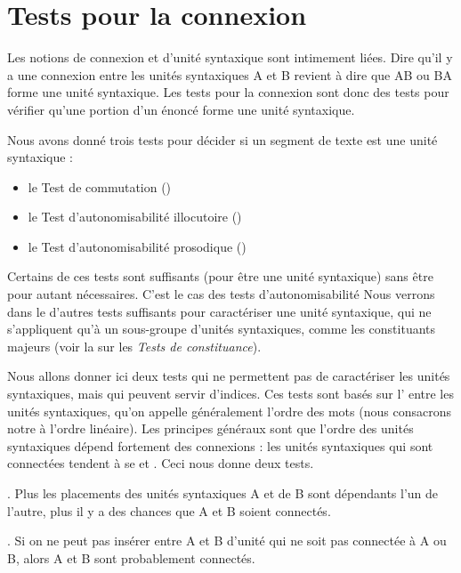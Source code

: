\section{Tests pour la connexion}\label{sec:3.2.16}%

Les notions de connexion et d’unité syntaxique sont intimement liées. Dire qu’il y a une connexion entre les unités syntaxiques A et B revient à dire que AB ou BA forme une unité syntaxique. Les tests pour la connexion sont donc des tests pour vérifier qu’une portion d’un énoncé forme une unité syntaxique.

Nous avons donné trois tests pour décider si un segment de texte est une unité syntaxique :

\begin{itemize}
\item le Test de commutation ()
\item le Test d’autonomisabilité illocutoire ()
\item le Test d’autonomisabilité prosodique ()
\end{itemize}

Certains de ces tests sont suffisants (pour être une unité syntaxique) sans être pour autant nécessaires. C'est le cas des tests d'autonomisabilité
Nous verrons dans le  d'autres tests suffisants pour caractériser une unité syntaxique, qui ne s’appliquent qu’à un sous-groupe d’unités syntaxiques, comme les constituants majeurs (voir la  sur les \textit{Tests de constituance}).

Nous allons donner ici deux tests qui ne permettent pas de caractériser les unités syntaxiques, mais qui peuvent servir d'indices. Ces tests sont basés sur l' entre les unités syntaxiques, qu'on appelle généralement l'ordre des mots (nous consacrons notre  à l'ordre linéaire). Les principes généraux sont que l’ordre des unités syntaxiques dépend fortement des connexions : les unités syntaxiques qui sont connectées tendent à se   et . Ceci nous donne deux tests.

{. Plus les placements des unités syntaxiques A et de B sont dépendants l’un de l’autre, plus il y a des chances que A et B soient connectés.}

{. Si on ne peut pas insérer entre A et B d’unité qui ne soit pas connectée à A ou B, alors A et B sont probablement connectés.}

